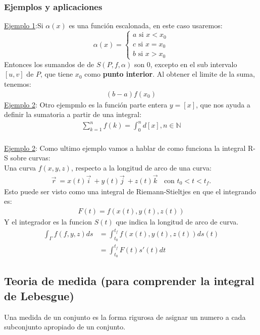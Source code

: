 \documentclass{article}
\begin{document}
	\subsubsection{Ejemplos y aplicaciones}
	\underline {Ejemplo 1}:Si $ \alpha(x)$ es una función escalonada, en este caso usaremos:
	\[
	\alpha(x) =
	\begin{cases}
		a \text{ si } x < x_0\\
		c \text{ si } x = x_0\\
		b \text{ si } x > x_0
	\end{cases}
	\] 	
	Entonces los sumandos de de $S(P,f,\alpha)$ son 0, excepto en el sub intervalo $[u,v]$ de 
	$P$, que tiene  $x_0$ como \textbf{punto interior}. Al obtener el limite de la suma,
	tenemos:
	\begin{equation}
		\begin{aligned}
			(b-a)f(x_0)
		\end{aligned}
	\end{equation}
	\underline {Ejemplo 2}:
	Otro ejempmlo es la función parte entera $y=[x]$, que nos ayuda a definir la sumatoria
	a partir de una integral:
	\begin{equation}
		\begin{aligned}
			\sum_{k=1}^{n}f(k) = \int_{0}^{n}d[x], n \in \mathbb{N}
		\end{aligned}
	\end{equation}
	\\
	\underline {Ejemplo 2}:
	Como ultimo ejemplo vamos a hablar de como funciona la integral R-S sobre curvas:\\
	Una curva $f(x,y,z)$, respecto a la longitud de arco de una curva:
	\begin{equation}
		\begin{aligned}
			\vec{r}^{\ } = x(t)\vec{i}^{\ } + y(t) \vec{j}^{\ } +
			z(t) \vec{k}^{\ }\text{ } \text{con } t_0 < t < t_f.
		\end{aligned}
	\end{equation}
	Esto puede ser visto como una integral de Riemann-Stieltjes en que el integrando es:
	\begin{equation}
		\begin{aligned}
			F(t) = f(x(t),y(t),z(t))
		\end{aligned}
	\end{equation}
	Y el integrador es la funcion  $S(t)$ que indica la longitud de arco de curva.
	 \begin{equation}
		\begin{aligned}
			\int_{\Gamma}^{}f(f,y,z) ds &= \int_{t_0}^{t_f}f(x(t),y(t),z(t))ds(t)\\
						    &= \int_{t_0}^{t_f}F(t)s'(t)dt
		\end{aligned}
	\end{equation}

	\subsection{Teoria de medida (para comprender la integral de Lebesgue)}
	Una medida de un conjunto es la forma rigurosa de asignar un numero a cada
	subconjunto apropiado de un conjunto.
\end{document}
